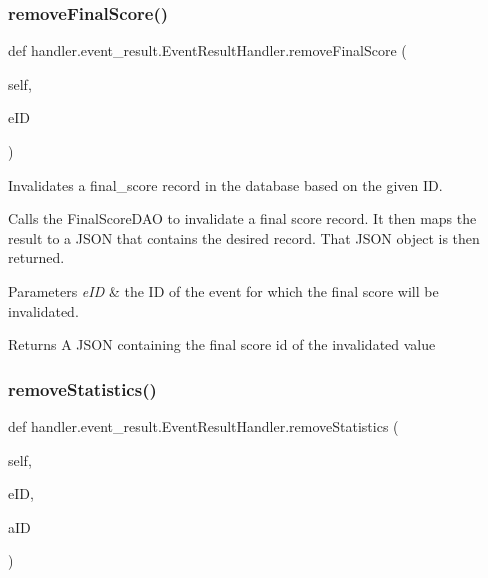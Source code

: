 \subsubsection{\texorpdfstring{remove\+Final\+Score()}{removeFinalScore()}}
{\footnotesize\ttfamily def handler.\+event\+\_\+result.\+Event\+Result\+Handler.\+remove\+Final\+Score (\begin{DoxyParamCaption}\item[{}]{self,  }\item[{}]{e\+ID }\end{DoxyParamCaption})}



Invalidates a final\+\_\+score record in the database based on the given ID. 

Calls the Final\+Score\+D\+AO to invalidate a final score record. It then maps the result to a J\+S\+ON that contains the desired record. That J\+S\+ON object is then returned.


\begin{DoxyParams}{Parameters}
{\em e\+ID} & the ID of the event for which the final score will be invalidated.\\
\hline
\end{DoxyParams}
\begin{DoxyReturn}{Returns}
A J\+S\+ON containing the final score id of the invalidated value 
\end{DoxyReturn}
\mbox{\label{classhandler_1_1event__result_1_1_event_result_handler_a149d5152b04f09f3d37856befac27e59}} 
\subsubsection{\texorpdfstring{remove\+Statistics()}{removeStatistics()}}
{\footnotesize\ttfamily def handler.\+event\+\_\+result.\+Event\+Result\+Handler.\+remove\+Statistics (\begin{DoxyParamCaption}\item[{}]{self,  }\item[{}]{e\+ID,  }\item[{}]{a\+ID }\end{DoxyParamCaption})}



